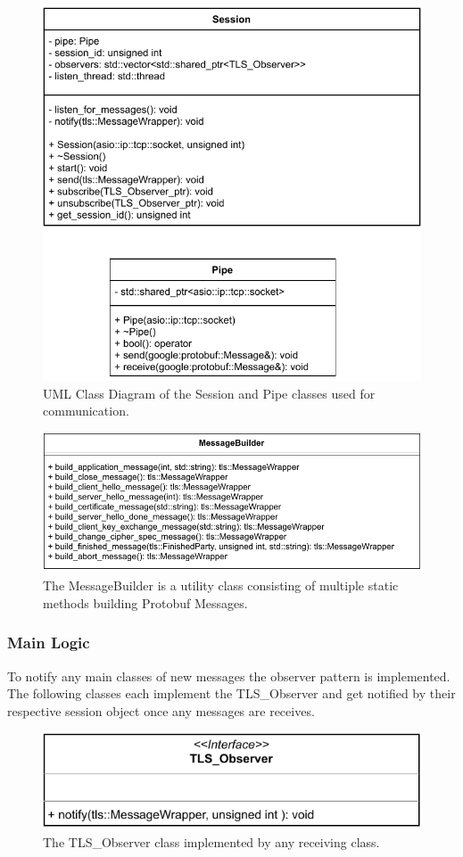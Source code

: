\documentclass[12pt, letterpaper]{article}
\begin{document}
\begin{figure}[H]
	\centering
	\includegraphics[width=.6\textwidth]{UML/CommunicationClasses}
	\caption{UML Class Diagram of the Session and Pipe classes used for communication.}
	\label{fig:CommunicationClasses}
\end{figure}

\begin{figure}[H]
	\centering
	\includegraphics[width=.7\textwidth]{UML/Messagebuilder}
	\caption{The MessageBuilder is a utility class consisting of multiple static methods building Protobuf Messages.}
	\label{fig:Messagebuilder}
\end{figure}

\pagebreak

\subsubsection{Main Logic}
To notify any main classes of new messages the observer pattern is implemented. The following classes each implement the TLS\_Observer and get notified by their respective session object once any messages are receives.

\begin{figure}[H]
	\centering
	\includegraphics[width=.7\textwidth]{UML/Observer}
	\caption{The TLS\_Observer class implemented by any receiving class.}
	\label{fig:Observer}
\end{figure}
\end{document}
